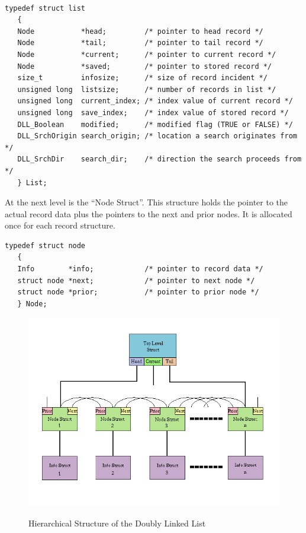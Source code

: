 \documentclass[10pt,letterpaper,titlepage]{article}
\begin{document}
\small
\begin{verbatim}

typedef struct list
   {
   Node           *head;         /* pointer to head record */
   Node           *tail;         /* pointer to tail record */
   Node           *current;      /* pointer to current record */
   Node           *saved;        /* pointer to stored record */
   size_t         infosize;      /* size of record incident */
   unsigned long  listsize;      /* number of records in list */
   unsigned long  current_index; /* index value of current record */
   unsigned long  save_index;    /* index value of stored record */
   DLL_Boolean    modified;      /* modified flag (TRUE or FALSE) */
   DLL_SrchOrigin search_origin; /* location a search originates from */
   DLL_SrchDir    search_dir;    /* direction the search proceeds from */
   } List;
\end{verbatim}
\normalsize
\vspace{8pt}

\noindent
At the next level is the ``Node Struct''.  This structure holds the pointer to the actual record data plus the pointers to the next and prior nodes.  It is allocated once for each record structure.

\small
\begin{verbatim}
typedef struct node
   {
   Info        *info;            /* pointer to record data */
   struct node *next;            /* pointer to next node */
   struct node *prior;           /* pointer to prior node */
   } Node;
\end{verbatim}
\normalsize
\vspace{8pt}

\begin{figure}
\begin{center}
\graphicspath{{.}}
\includegraphics[width=4.75in,hight=4.2in]{linklistDiagram.png}
\vspace{8pt}

Hierarchical Structure of the Doubly Linked List
\end{center}
\end{figure}
\end{document}
